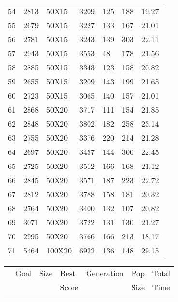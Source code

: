 \documentclass[14pt]{acmsiggraph}
\begin{document}
\begin{table}[h!]
\begin{center}
{\begin{tabular}{lllllll||}
					54  & 2813 & 50X15  & \cellcolor[rgb]{0.59,0.74,0.34}3209 & 125 & 188  & 19.27 \\
					55  & 2679 & 50X15  & \cellcolor[rgb]{0.66,0.77,0.37}3227 & 133 & 167  & 21.01 \\
					56  & 2781 & 50X15  & \cellcolor[rgb]{0.62,0.75,0.35}3243 & 139 & 303  & 22.11 \\
					57  & 2943 & 50X15  & \cellcolor[rgb]{0.67,0.77,0.37}3553 & 48  & 178  & 21.56 \\
					58  & 2885 & 50X15  & \cellcolor[rgb]{0.61,0.75,0.35}3343 & 123 & 158  & 20.82 \\
					59  & 2655 & 50X15  & \cellcolor[rgb]{0.67,0.77,0.37}3209 & 143 & 199  & 21.65 \\
					60  & 2723 & 50X15  & \cellcolor[rgb]{0.57,0.73,0.33}3065 & 140 & 157  & 21.01 \\
					61  & 2868 & 50X20  & \cellcolor[rgb]{0.76,0.81,0.41}3717 & 111 & 154  & 21.85 \\
					62  & 2848 & 50X20  & \cellcolor[rgb]{0.81,0.83,0.43}3802 & 182 & 258  & 23.14 \\
					63  & 2755 & 50X20  & \cellcolor[rgb]{0.69,0.78,0.38}3376 & 220 & 214  & 21.28 \\
					64  & 2697 & 50X20  & \cellcolor[rgb]{0.75,0.81,0.41}3457 & 144 & 300  & 22.45 \\
					65  & 2725 & 50X20  & \cellcolor[rgb]{0.76,0.81,0.41}3512 & 166 & 168  & 21.12 \\
					66  & 2845 & 50X20  & \cellcolor[rgb]{0.72,0.8,0.4}3571   & 187 & 223  & 22.72 \\
					67  & 2812 & 50X20  & \cellcolor[rgb]{0.82,0.84,0.44}3788 & 158 & 181  & 20.32 \\
					68  & 2764 & 50X20  & \cellcolor[rgb]{0.69,0.78,0.38}3400 & 132 & 107  & 20.82 \\
					69  & 3071 & 50X20  & \cellcolor[rgb]{0.67,0.78,0.37}3722 & 131 & 130  & 21.27 \\
					70  & 2995 & 50X20  & \cellcolor[rgb]{0.72,0.8,0.4}3766   & 166 & 213  & 18.17 \\
					71  & 5464 & 100X20 & \cellcolor[rgb]{0.73,0.8,0.4}6922   & 136 & 148  & 29.15 \\
				\end{tabular}\centering
			}
			\subtable
			{
				\begin{tabular}{||lllllll}
					 & Goal   & Size   & Best & Generation & Pop & Total \\ 
					 &  &    & Score &   &  Size & Time \\ \hline \\

\end{tabular}}
\end{center}
\end{table}
\end{document}
